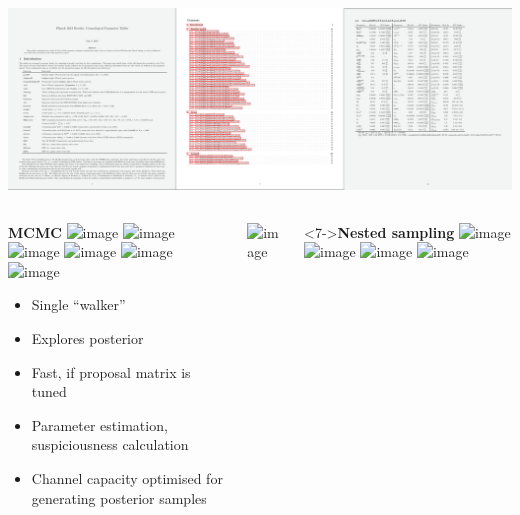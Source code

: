 \documentclass[aspectratio=169]{beamer}
\begin{document}
\begin{frame}
\begin{columns}
        \includegraphics[width=\textwidth]{figures/pla1}
    \end{columns}
\end{frame}

\begin{frame}
    \begin{columns}
        \begin{block}{\textbf{MCMC}}
            \includegraphics<1>[width=\textwidth,page=16]{figures/himmelblau}%
            \includegraphics<2>[width=\textwidth,page=17]{figures/himmelblau}%
            \includegraphics<3>[width=\textwidth,page=18]{figures/himmelblau}%
            \includegraphics<4>[width=\textwidth,page=19]{figures/himmelblau}%
            \includegraphics<5>[width=\textwidth,page=20]{figures/himmelblau}%
            \includegraphics<6-15>[width=\textwidth,page=21]{figures/himmelblau}%
            \begin{itemize}
                \item<16> Single ``walker''
                \item<16> Explores posterior
                \item<16> Fast, if proposal matrix is tuned
                \item<16> Parameter estimation, suspiciousness calculation
                \item<16> Channel capacity optimised for generating posterior samples
            \end{itemize}
        \end{block}
        \centerline{\includegraphics<16>[width=0.5\textwidth,page=19]{figures/himmelblau}}
        \begin{block}<7->{\textbf{Nested sampling}}
            \includegraphics<7|handout:0>[width=\textwidth,page=1]{figures/himmelblau}%
            \includegraphics<8|handout:0>[width=\textwidth,page=2]{figures/himmelblau}%
            \includegraphics<9|handout:0>[width=\textwidth,page=3]{figures/himmelblau}%
            \includegraphics<10          >[width=\textwidth,page=4]{figures/himmelblau}%

\end{block}
\end{columns}
\end{frame}
\end{document}
